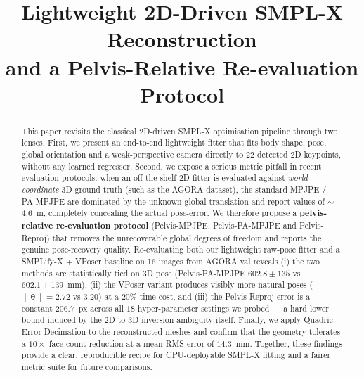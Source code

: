 \documentclass[conference]{IEEEtran}
\begin{document}
\title{Lightweight 2D-Driven SMPL-X Reconstruction \\ and a Pelvis-Relative Re-evaluation Protocol}

\author{
}

\maketitle

\begin{abstract}
This paper revisits the classical 2D-driven SMPL-X optimisation pipeline through two lenses. First, we present an end-to-end lightweight fitter that fits body shape, pose, global orientation and a weak-perspective camera directly to 22 detected 2D keypoints, without any learned regressor. Second, we expose a serious metric pitfall in recent evaluation protocols: when an off-the-shelf 2D fitter is evaluated against \emph{world-coordinate} 3D ground truth (such as the AGORA dataset), the standard MPJPE / PA-MPJPE are dominated by the unknown global translation and report values of $\sim$4.6~m, completely concealing the actual pose-error. We therefore propose a \textbf{pelvis-relative re-evaluation protocol} (Pelvis-MPJPE, Pelvis-PA-MPJPE and Pelvis-Reproj) that removes the unrecoverable global degrees of freedom and reports the genuine pose-recovery quality. Re-evaluating both our lightweight raw-pose fitter and a SMPLify-X + VPoser baseline on 16 images from AGORA val reveals (i) the two methods are statistically tied on 3D pose (Pelvis-PA-MPJPE $602.8 \pm 135$ vs $602.1 \pm 139$~mm), (ii) the VPoser variant produces visibly more natural poses ($\| \boldsymbol{\theta} \| = 2.72$ vs $3.20$) at a $20\%$ time cost, and (iii) the Pelvis-Reproj error is a constant $206.7$~px across all $18$ hyper-parameter settings we probed --- a hard lower bound induced by the 2D-to-3D inversion ambiguity itself. Finally, we apply Quadric Error Decimation to the reconstructed meshes and confirm that the geometry tolerates a $10\times$ face-count reduction at a mean RMS error of $14.3$~mm. Together, these findings provide a clear, reproducible recipe for CPU-deployable SMPL-X fitting and a fairer metric suite for future comparisons.
\end{abstract}
\end{document}
